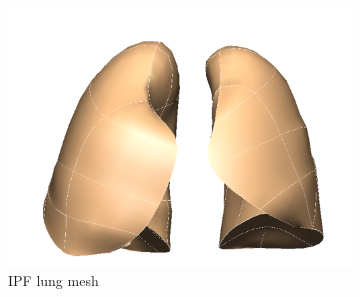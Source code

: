 \begin{figure}[htbp] 
\centering
\begin{subfigure}{.49\linewidth}%
  \includegraphics[width=\linewidth,trim={{.0\wd0} {.0\wd0} {.0\wd0} {.0\wd0}},clip]{ModelBasedAnalysis/Image/IPF405_IPFLungMesh.png}
  \caption{IPF lung mesh}
  \label{fig:LungShapePrediction-a} 
\end{subfigure}
\hspace{.4in} %
\begin{subfigure}{.4\linewidth}%

\end{subfigure}
\end{figure}
